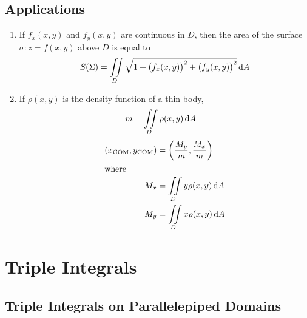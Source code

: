 \documentclass[fleqn, a4paper, 12pt]{article}
\theoremstyle{definition}
\theoremstyle{theorem}
\theoremstyle{remark}
\begin{document}
\subsection{Applications}

\begin{enumerate}
	\item If $f_x(x,y)$ and $f_y(x,y)$ are continuous in $D$, then the area of the surface $\sigma : z = f(x,y)$ above $D$ is equal to 
		\begin{equation*}
			S(\Sigma) = \iint\limits_{D} \sqrt{1 + \left( f_x(x,y) \right)^2 + \left( f_y(x,y) \right)^2} \dif A
		\end{equation*}
	\item If $\rho(x,y)$ is the density function of a thin body,
		\begin{align*}
			m &= \iint\limits_{D} \rho(x,y) \dif A
		\end{align*}
		\begin{align*}
			(x_{\text{COM}}, y_{\text{COM}}) &= \left( \dfrac{M_y}{m}, \dfrac{M_x}{m} \right)\\
			\intertext{where}
			M_x &= \iint\limits_{D} y \rho(x,y) \dif A\\
			M_y &= \iint\limits_{D} x \rho(x,y) \dif A\\
		\end{align*}
\end{enumerate}

\section{Triple Integrals}

\subsection{Triple Integrals on Parallelepiped Domains}
\end{document}
